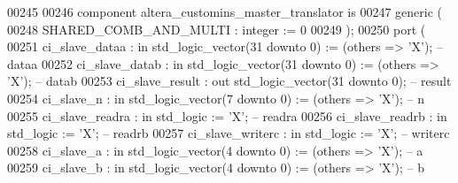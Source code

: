 \begin{DoxyCode}
00245 
00246     \textcolor{keywordflow}{component} altera\_customins\_master\_translator \textcolor{keywordflow}{is}
00247         \textcolor{keywordflow}{generic} (
00248             SHARED\_COMB\_AND\_MULTI : \textcolor{comment}{integer} := \textcolor{vhdllogic}{}\textcolor{vhdllogic}{0}
00249         );
00250         \textcolor{keywordflow}{port} (
00251             ci\_slave\_dataa            : \textcolor{keywordflow}{in}  \textcolor{comment}{std\_logic\_vector}(\textcolor{vhdllogic}{}\textcolor{vhdllogic}{31} \textcolor{keywordflow}{downto} \textcolor{vhdllogic}{}\textcolor{vhdllogic}{0}) := (\textcolor{keywordflow}{others} => 'X'); \textcolor{keyword}{-- dataa}
00252             ci\_slave\_datab            : \textcolor{keywordflow}{in}  \textcolor{comment}{std\_logic\_vector}(\textcolor{vhdllogic}{}\textcolor{vhdllogic}{31} \textcolor{keywordflow}{downto} \textcolor{vhdllogic}{}\textcolor{vhdllogic}{0}) := (\textcolor{keywordflow}{others} => 'X'); \textcolor{keyword}{-- datab}
00253             ci\_slave\_result           : \textcolor{keywordflow}{out} \textcolor{comment}{std\_logic\_vector}(\textcolor{vhdllogic}{}\textcolor{vhdllogic}{31} \textcolor{keywordflow}{downto} \textcolor{vhdllogic}{}\textcolor{vhdllogic}{0});                    \textcolor{keyword}{-- result}
00254             ci\_slave\_n                : \textcolor{keywordflow}{in}  \textcolor{comment}{std\_logic\_vector}(\textcolor{vhdllogic}{}\textcolor{vhdllogic}{7} \textcolor{keywordflow}{downto} \textcolor{vhdllogic}{}\textcolor{vhdllogic}{0})  := (\textcolor{keywordflow}{others} => 'X'); \textcolor{keyword}{-- n}
00255             ci\_slave\_readra           : \textcolor{keywordflow}{in}  \textcolor{comment}{std\_logic}                     := 'X';             \textcolor{keyword}{-- readra}
00256             ci\_slave\_readrb           : \textcolor{keywordflow}{in}  \textcolor{comment}{std\_logic}                     := 'X';             \textcolor{keyword}{-- readrb}
00257             ci\_slave\_writerc          : \textcolor{keywordflow}{in}  \textcolor{comment}{std\_logic}                     := 'X';             \textcolor{keyword}{-- writerc}
00258             ci\_slave\_a                : \textcolor{keywordflow}{in}  \textcolor{comment}{std\_logic\_vector}(\textcolor{vhdllogic}{}\textcolor{vhdllogic}{4} \textcolor{keywordflow}{downto} \textcolor{vhdllogic}{}\textcolor{vhdllogic}{0})  := (\textcolor{keywordflow}{others} => 'X'); \textcolor{keyword}{-- a}
00259             ci\_slave\_b                : \textcolor{keywordflow}{in}  \textcolor{comment}{std\_logic\_vector}(\textcolor{vhdllogic}{}\textcolor{vhdllogic}{4} \textcolor{keywordflow}{downto} \textcolor{vhdllogic}{}\textcolor{vhdllogic}{0})  := (\textcolor{keywordflow}{others} => 'X'); \textcolor{keyword}{-- b}

\end{DoxyCode}

